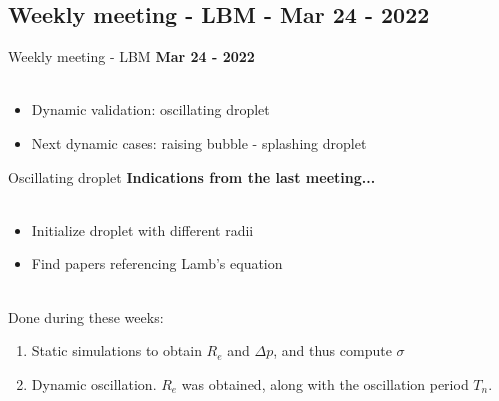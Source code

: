 \documentclass{beamer}
\begin{document}
	\subsection{Weekly meeting - LBM - Mar 24 - 2022}
	\label{}
	\justifying
	\begin{frame}{Weekly meeting - LBM}
		\textbf{Mar 24 - 2022}\\~\\
		\begin{itemize}
			
			\item Dynamic validation: oscillating droplet
			\item Next dynamic cases: raising bubble - splashing droplet
			
		\end{itemize}
	\end{frame}
	
	\begin{frame}{Oscillating droplet}
		\textbf{Indications from the last meeting...}\\~\\
		\begin{itemize}
			\item Initialize droplet with different radii
			\item Find papers referencing Lamb's equation
		\end{itemize}
		
		
		~\\ Done during these weeks:
		\begin{enumerate}
			\item Static simulations to obtain $R_e$ and $\Delta p$, and thus compute $\sigma$
			\item Dynamic oscillation. $R_e$ was obtained, along with the oscillation period $T_n$.
		\end{enumerate}
	
	\end{frame}
	
\end{document}
